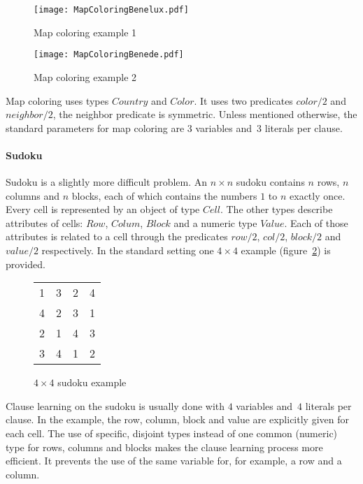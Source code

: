 \begin{figure}
\centering
\begin{minipage}{.5\textwidth}
  \centering
  \texttt{[image: MapColoringBenelux.pdf]}
  \caption{Map coloring example 1}
  \label{fig:setup_mapcolor_benelux}
\end{minipage}
\begin{minipage}{.5\textwidth}
  \centering
  \texttt{[image: MapColoringBenede.pdf]}
  \caption{Map coloring example 2}
  \label{fig:setup_mapcolor_benede}
\end{minipage}
\end{figure}

Map coloring uses types $\mathit{Country}$ and $\mathit{Color}$.
It uses two predicates $\mathit{color/2}$ and $\mathit{neighbor/2}$, the neighbor predicate is symmetric.
Unless mentioned otherwise, the standard parameters for map coloring are $3$ variables and~$3$ literals per clause.

\paragraph{Sudoku}
Sudoku is a slightly more difficult problem.
An $n \times n$ sudoku contains $n$ rows, $n$ columns and $n$ blocks, each of which contains the numbers $1$ to $n$ exactly once.
Every cell is represented by an object of type $\mathit{Cell}$.
The other types describe attributes of cells: $\mathit{Row}$, $\mathit{Colum}$, $\mathit{Block}$ and a numeric type $\mathit{Value}$.
Each of those attributes is related to a cell through the predicates $\mathit{row/2}$, $\mathit{col/2}$, $\mathit{block/2}$ and $\mathit{value/2}$ respectively.
In the standard setting one $4 \times 4$ example (figure~\ref{fig:setup_sudoku}) is provided.

\begin{figure}[!htp]
	\centering
	\begin{tabular}{|cc|cc|}
		\hline
		1 & 3 & 2 & 4 \\
		4 & 2 & 3 & 1 \\ \hline
		2 & 1 & 4 & 3 \\
		3 & 4 & 1 & 2 \\ \hline
	\end{tabular}
	\label{fig:setup_sudoku}
	\caption{$4 \times 4$ sudoku example}
\end{figure}

Clause learning on the sudoku is usually done with $4$ variables and~$4$ literals per clause.
In the example, the row, column, block and value are explicitly given for each cell.
The use of specific, disjoint types instead of one common (numeric) type for rows, columns and blocks makes the clause learning process more efficient.
It prevents the use of the same variable for, for example, a row and a column.

